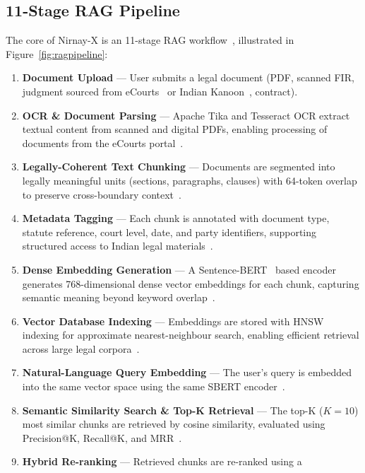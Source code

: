 \documentclass[12pt,a4paper]{article}
\begin{document}
\subsection{11-Stage RAG Pipeline}

The core of Nirnay-X is an 11-stage RAG workflow~\cite{lewis2020rag}, illustrated in
Figure~\ref{fig:ragpipeline}:

\begin{enumerate}[leftmargin=*, label=\textbf{Stage \arabic*:}, itemsep=4pt]
  \item \textbf{Document Upload} --- User submits a legal document (PDF, scanned FIR,
    judgment sourced from eCourts~\cite{ecourts} or Indian Kanoon~\cite{indiankanoon},
    contract).
  \item \textbf{OCR \& Document Parsing} --- Apache Tika and Tesseract OCR extract
    textual content from scanned and digital PDFs, enabling processing of documents
    from the eCourts portal~\cite{ecourts}.
  \item \textbf{Legally-Coherent Text Chunking} --- Documents are segmented into legally
    meaningful units (sections, paragraphs, clauses) with 64-token overlap to preserve
    cross-boundary context~\cite{manning2008ir}.
  \item \textbf{Metadata Tagging} --- Each chunk is annotated with document type, statute
    reference, court level, date, and party identifiers, supporting structured access
    to Indian legal materials~\cite{ecourts, mlaw}.
  \item \textbf{Dense Embedding Generation} --- A Sentence-BERT~\cite{reimers2019sbert}
    based encoder generates 768-dimensional dense vector embeddings for each chunk,
    capturing semantic meaning beyond keyword overlap~\cite{manning2008ir}.
  \item \textbf{Vector Database Indexing} --- Embeddings are stored with HNSW indexing
    for approximate nearest-neighbour search, enabling efficient retrieval across large
    legal corpora~\cite{manning2008ir}.
  \item \textbf{Natural-Language Query Embedding} --- The user's query is embedded into
    the same vector space using the same SBERT encoder~\cite{reimers2019sbert}.
  \item \textbf{Semantic Similarity Search \& Top-K Retrieval} --- The top-K ($K=10$)
    most similar chunks are retrieved by cosine similarity, evaluated using
    Precision@K, Recall@K, and MRR~\cite{manning2008ir}.
  \item \textbf{Hybrid Re-ranking} --- Retrieved chunks are re-ranked using a

\end{enumerate}
\end{document}
